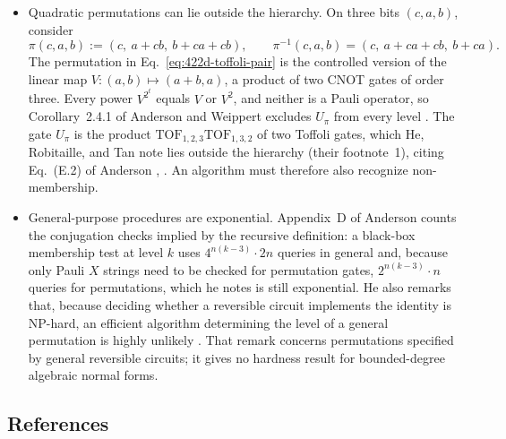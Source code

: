\begin{itemize}
  \item Quadratic permutations can lie outside the hierarchy.  On three bits
  $(c,a,b)$, consider
  \begin{equation}
    \pi(c,a,b):=(c,\ a+cb,\ b+ca+cb),
    \qquad
    \pi^{-1}(c,a,b)=(c,\ a+ca+cb,\ b+ca).
    \label{eq:422d-toffoli-pair}
  \end{equation}
  The permutation in Eq.~\eqref{eq:422d-toffoli-pair} is the controlled version
  of the linear map $V:(a,b)\mapsto(a+b,a)$, a product of two CNOT gates of
  order three.  Every power $V^{2^t}$ equals $V$ or $V^2$, and neither is a
  Pauli operator, so Corollary~2.4.1 of Anderson and Weippert excludes $U_\pi$
  from every level .  The gate
  $U_\pi$ is the product $\mathrm{TOF}_{1,2,3}\mathrm{TOF}_{1,3,2}$ of two
  Toffoli gates, which He, Robitaille, and Tan note lies outside the hierarchy
  (their footnote~1), citing Eq.~(E.2) of Anderson
  ,
  .  An algorithm must therefore also
  recognize non-membership.

  \item General-purpose procedures are exponential.  Appendix~D of Anderson counts
  the conjugation checks implied by the recursive definition: a black-box
  membership test at level $k$ uses $4^{n(k-3)}\cdot2n$ queries in general and,
  because only Pauli $X$ strings need to be checked for permutation gates,
  $2^{n(k-3)}\cdot n$ queries for permutations, which he notes is still
  exponential.  He also remarks that, because deciding whether a reversible
  circuit implements the identity is NP-hard, an efficient algorithm
  determining the level of a general permutation is highly unlikely
  .  That remark concerns permutations
  specified by general reversible circuits; it gives no hardness result for
  bounded-degree algebraic normal forms.
\end{itemize}

\subsection*{References}

